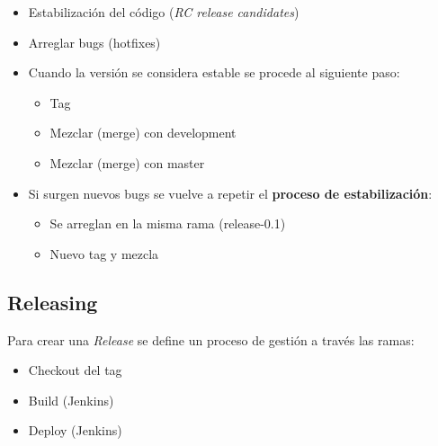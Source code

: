 \begin{itemize}
    \item Estabilización del código (\emph{RC release candidates})
    \item Arreglar bugs (hotfixes)
    \item Cuando la versión se considera estable se procede al siguiente paso:
        \begin{itemize}
            \item Tag
            \item Mezclar (merge) con development
            \item Mezclar (merge) con master
        \end{itemize}
    \item Si surgen nuevos bugs se vuelve a repetir el \textbf{proceso de estabilización}:
        \begin{itemize}
            \item Se arreglan en la misma rama (release-0.1)
            \item Nuevo tag y mezcla
        \end{itemize}
\end{itemize}

\subsection{Releasing}

\par Para crear una \emph{Release} se define un proceso de gestión a través las ramas:

\begin{itemize}
    \item Checkout del tag
    \item Build (Jenkins)
    \item Deploy (Jenkins)
\end{itemize}


